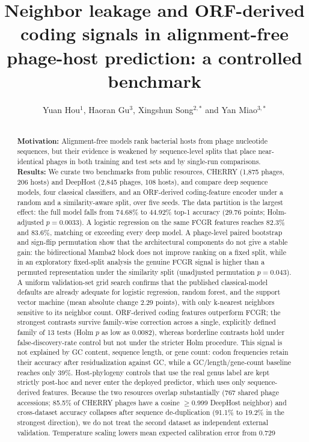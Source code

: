 \documentclass[utf8]{FrontiersinVancouver}
\def\firstAuthorLast{Hou}
\def\Authors{Yuan Hou$^{1}$, Haoran Gu$^{3}$, Xingshun Song$^{2,*}$ and Yan Miao$^{3,*}$}
\begin{document}
\onecolumn
{}

\title{Neighbor leakage and ORF-derived coding signals in alignment-free phage-host prediction: a controlled benchmark}

\author[\firstAuthorLast]{\Authors}
\address{}
\correspondance{}
\extraAuth{}
\maketitle

\begin{abstract}
\section{}
\textbf{Motivation:} Alignment-free models rank bacterial hosts from phage nucleotide sequences, but their evidence is weakened by sequence-level splits that place near-identical phages in both training and test sets and by single-run comparisons. \textbf{Results:} We curate two benchmarks from public resources, CHERRY (1,875 phages, 206 hosts) and DeepHost (2,845 phages, 108 hosts), and compare deep sequence models, four classical classifiers, and an ORF-derived coding-feature encoder under a random and a similarity-aware split, over five seeds. The data partition is the largest effect: the full model falls from 74.68\% to 44.92\% top-1 accuracy (29.76 points; Holm-adjusted $p=0.0033$). A logistic regression on the same FCGR features reaches 82.3\% and 83.6\%, matching or exceeding every deep model. A phage-level paired bootstrap and sign-flip permutation show that the architectural components do not give a stable gain: the bidirectional Mamba2 block does not improve ranking on a fixed split, while in an exploratory fixed-split analysis the genuine FCGR signal is higher than a permuted representation under the similarity split (unadjusted permutation $p=0.043$). A uniform validation-set grid search confirms that the published classical-model defaults are already adequate for logistic regression, random forest, and the support vector machine (mean absolute change 2.29 points), with only k-nearest neighbors sensitive to its neighbor count. ORF-derived coding features outperform FCGR; the strongest contrasts survive family-wise correction across a single, explicitly defined family of 13 tests (Holm $p$ as low as 0.0082), whereas borderline contrasts hold under false-discovery-rate control but not under the stricter Holm procedure. This signal is not explained by GC content, sequence length, or gene count: codon frequencies retain their accuracy after residualization against GC, while a GC/length/gene-count baseline reaches only 39\%. Host-phylogeny controls that use the real genus label are kept strictly post-hoc and never enter the deployed predictor, which uses only sequence-derived features. Because the two resources overlap substantially (767 shared phage accessions; 85.5\% of CHERRY phages have a cosine $\geq$0.999 DeepHost neighbor) and cross-dataset accuracy collapses after sequence de-duplication (91.1\% to 19.2\% in the strongest direction), we do not treat the second dataset as independent external validation. Temperature scaling lowers mean expected calibration error from 0.729 
\end{abstract}
\end{document}
